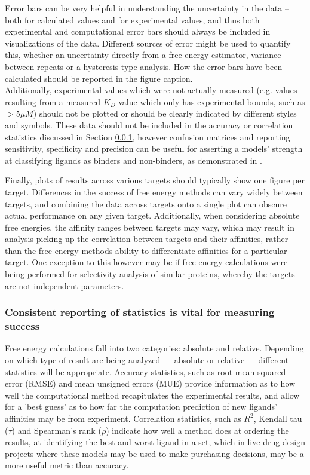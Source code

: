 \documentclass[9pt,bestpractices]{livecoms}
\begin{document}
Error bars can be very helpful in understanding the uncertainty in the data -- both for calculated values and for experimental values, and thus both experimental and computational error bars should always be included in visualizations of the data. Different sources of error might be used to quantify this, whether an uncertainty directly from a free energy estimator, variance between repeats or a hysteresis-type analysis. How the error bars have been calculated should be reported in the figure caption.\\


Additionally, experimental values which were not actually measured (e.g. values resulting from a measured $K_D$ value which only has experimental bounds, such as $> 5 \mu M$) should not be plotted or should be clearly indicated by different styles and symbols. These data should not be included in the accuracy or correlation statistics discussed in Section \ref{sec:statistical_analysis}, however confusion matrices and reporting sensitivity, specificity and precision can be useful for asserting a models' strength at classifying ligands as binders and non-binders, as demonstrated in \cite{hauserPredictingResistanceClinical2018}.

Finally, plots of results across various targets should typically show one figure per target. Differences in the success of free energy methods can vary widely between targets, and combining the data across targets onto a single plot can obscure actual performance on any given target. Additionally, when considering absolute free energies, the affinity ranges between targets may vary, which may result in analysis picking up the correlation between targets and their affinities, rather than the free energy methods ability to differentiate affinities for a particular target. One exception to this however may be if free energy calculations were being performed for selectivity analysis of similar proteins, whereby the targets are not independent parameters\cite{aldeghiPredictionsLigandSelectivity2017}.

\subsubsection{Consistent reporting of statistics is vital for measuring success}
\label{sec:statistical_analysis}
Free energy calculations fall into two categories: absolute and relative. Depending on which type of result are being analyzed --- absolute or relative --- different statistics will be appropriate. Accuracy statistics, such as root mean squared error (RMSE) and mean unsigned errors (MUE) provide information as to how well the computational method recapitulates the experimental results, and allow for a 'best guess' as to how far the computation prediction of new ligands' affinities may be from experiment. Correlation statistics, such as $R^{2}$, Kendall tau ($\tau$) and Spearman's rank ($\rho$) indicate how well a method does at ordering the results, at identifying the best and worst ligand in a set, which in live drug design projects where these models may be used to make purchasing decisions, may be a more useful metric than accuracy.\\
\end{document}

